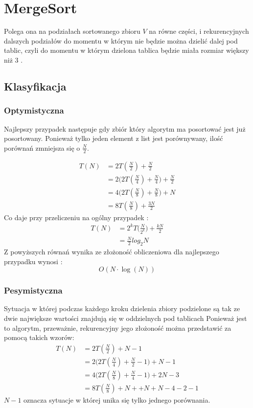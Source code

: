 \section{MergeSort}
Polega ona na podziałach sortowanego zbioru $V$ na równe części, i rekurencyjnych dalszych podziałów  do momentu w którym nie będzie można dzielić dalej pod tablic, czyli do momentu w którym dzielona tablica będzie miała rozmiar większy niż 3 \cite{mergesort}.
\subsection{Klasyfikacja}
\subsubsection{Optymistyczna}
Najlepszy przypadek następuje gdy zbiór który algorytm ma posortować jest już posortowany.
Ponieważ tylko jeden element z list jest porównywany, ilość porównań zmniejsza się o $\frac{N}{2}$.

\begin{align*}
T(N) &= 2T(\frac{N}{2}) +\frac{N}{2}  \\
 &= 2\Big(2T(\frac{N}{4})+ \frac{N}{4} \Big) + \frac{N}{2} \\
 &= 4\Big(2T(\frac{N}{8})+ \frac{N}{8} \Big) + N \\
 &= 8T(\frac{N}{8})+ \frac{3N}{2}
\end{align*}
Co daje przy przeliczeniu na ogólny przypadek :
\begin{align*}
T(N) &= 2^k T\Big(\frac{N}{2^k} \Big) + \frac{kN}{2} \\
&=\frac{N}{2}log_2 N
\end{align*}
Z powyższych równań wynika ze złożoność obliczeniowa dla najlepszego przypadku wynosi :
\begin{equation*}
O(N \cdot \log(N))
\end{equation*}
\subsubsection{Pesymistyczna}
Sytuacja w której podczas każdego kroku dzielenia zbiory podzielone są tak ze dwie największe wartości znajdują się w oddzielnych pod tablicach
Ponieważ jest to algorytm, przeważnie, rekurencyjny jego złożoność można przedstawić za pomocą takich wzorów:
\begin{align*}
T(N) &= 2T(\frac{N}{2}) + N -1 \\
 &= 2\Big(2T(\frac{N}{4})+ \frac{N}{2} -1 \Big) + N -1 \\
 &= 4\Big(2T(\frac{N}{8})+ \frac{N}{4} -1 \Big) + 2N -3 \\
 &= 8T(\frac{N}{8})+ N + + N+ N -4 - 2 - 1 
\end{align*}
$N-1$ oznacza sytuacje w której unika się tylko jednego porównania.\\

